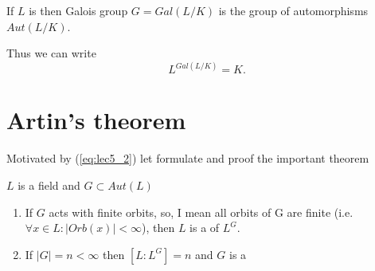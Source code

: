 \begin{definition}
  If $L$ is  then Galois group $G =
  Gal\left(L/K\right)$ is the group of automorphisms $Aut\left(L/K\right)$. 
  \label{def:galoisgroup}
\end{definition}

Thus we can write
\begin{equation}
  L^{Gal\left(L/K\right)} = K.
  \label{eq:lec5_2}
\end{equation}

\section{Artin's theorem}

Motivated by (\ref{eq:lec5_2}) let formulate and proof the important
theorem
\begin{theorem}[Artin]
  $L$ is a field and $G \subset Aut\left(L\right)$
  \begin{enumerate}
  \item If $G$ acts with finite orbits,  so, I mean all orbits of G
    are finite (i.e. $\forall x \in L: \left|Orb(x)\right| < \infty$),
    then $L$ is a  of $L^G$. 
  \item If $\left|G\right| = n < \infty$ then
    $\left[L : L^G\right] = n$ and $G$ is a 
  \end{enumerate}


\end{theorem}
